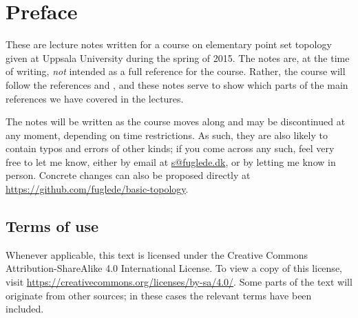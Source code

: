 \section{Preface}
\label{preface}
These are lecture notes written for a course on elementary point set topology given at Uppsala University during the spring of 2015. The notes are, at the time of writing, \emph{not} intended as a full reference for the course. Rather, the course will follow the references \cite{Mun} and \cite{Fje}, and these notes serve to show which parts of the main references we have covered in the lectures.

The notes will be written as the course moves along and may be discontinued at any moment, depending on time restrictions. As such, they are also likely to contain typos and errors of other kinds; if you come across any such, feel very free to let me know, either by email at \href{mailto:s@fuglede.dk}{\textsf{s@fuglede.dk}}, or by letting me know in person. Concrete changes can also be proposed directly at \url{https://github.com/fuglede/basic-topology}.

\subsection{Terms of use}
Whenever applicable, this text is licensed under the Creative Commons Attribution-ShareAlike 4.0 International License. To view a copy of this license, visit \url{https://creativecommons.org/licenses/by-sa/4.0/}. Some parts of the text will originate from other sources; in these cases the relevant terms have been included.
